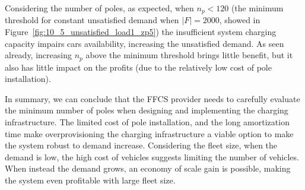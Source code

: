 Considering the number of poles, as expected, when $n_p<120$ (the minimum threshold for constant unsatisfied demand when $|F|=2000$, showed in Figure~\ref{fig:10_5_unsatisfied_load1_zp5}) the insufficient system charging capacity impairs cars availability, increasing the unsatisfied demand. 
As seen already, increasing $n_p$ above the minimum threshold brings little benefit, but it also has little impact on the profits (due to the relatively low cost of pole installation). 

In summary, we can conclude that the FFCS provider needs to carefully evaluate the minimum number of poles when designing and implementing the charging infrastructure. The limited cost of pole installation, and the long amortization time make overprovisioning the charging infrastructure a viable option to make the system robust to demand increase.
Considering the fleet size, when the demand is low, the high cost of vehicles suggests limiting the number of vehicles. When instead the demand grows, an economy of scale gain is possible, making the system even profitable with large fleet size.





